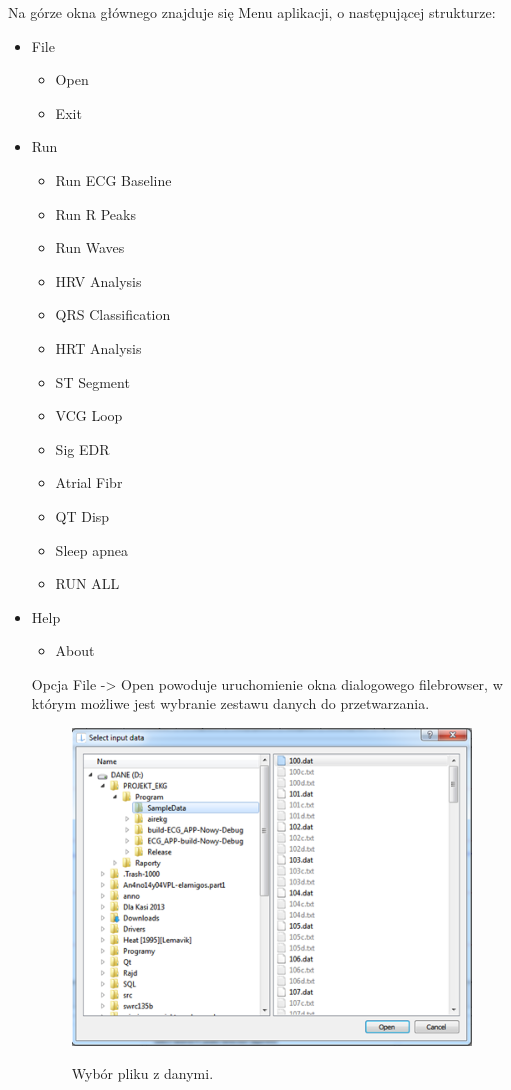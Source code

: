 Na górze okna głównego znajduje się Menu aplikacji, o następującej strukturze:

\begin{itemize}
\item File
\begin{itemize}
\item Open
\item Exit
\end{itemize}
\item Run
\begin{itemize}
\item Run ECG Baseline
\item Run R Peaks
\item Run Waves
\item HRV Analysis
\item QRS Classification
\item HRT Analysis
\item ST Segment
\item VCG Loop
\item Sig EDR
\item Atrial Fibr
\item QT Disp
\item Sleep apnea
\item RUN ALL
\end{itemize}
\item Help
\begin{itemize}
\item About
\end{itemize}

Opcja File -> Open powoduje uruchomienie okna dialogowego filebrowser, w którym możliwe jest wybranie zestawu danych do przetwarzania.

\begin{figure}[H]
\centering
\includegraphics[width=\textwidth]{GUI/img/file_b}
\label{fig:file_b}
\caption{Wybór pliku z danymi.}
\end{figure}


\end{itemize}
